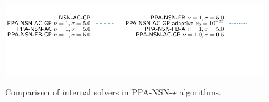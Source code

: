 \begin{figure}
 \\
{\includegraphics[height=\legendheight]{../figure/PROX/NSN/InternalSolvers/1.0e-08/50/time/profile-Chain_legend.pdf}}
   \caption{Comparison of internal solvers in {\sf PPA-NSN-$\star$} algorithms.}
  \label{fig:PROX/NSN/InternalSolvers}
\end{figure}
